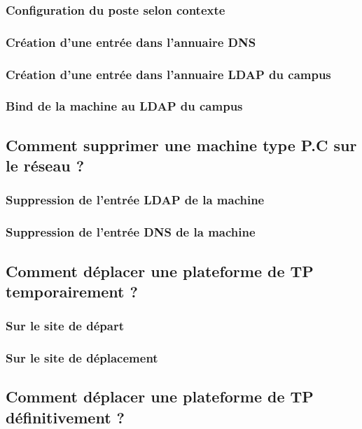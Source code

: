 \documentclass[a4paper]{article}
\begin{document}
\subsubsection{Configuration du poste selon contexte}

\subsubsection{Création d'une entrée dans l'annuaire DNS}

\subsubsection{Création d'une entrée dans l'annuaire LDAP du campus}

\subsubsection{Bind de la machine au LDAP du campus}

\subsection{Comment supprimer une machine type P.C sur le réseau ?}

\subsubsection{Suppression de l'entrée LDAP de la machine}

\subsubsection{Suppression de l'entrée DNS de la machine}

\subsection{Comment déplacer une plateforme de TP temporairement ?}

\subsubsection{Sur le site de départ}

\subsubsection{Sur le site de déplacement}

\subsection{Comment déplacer une plateforme de TP définitivement ?}
\end{document}
